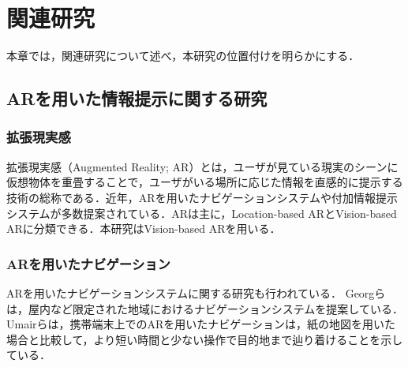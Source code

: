 \chapter{関連研究}
\label{chapter:relatedwork}
本章では，関連研究について述べ，本研究の位置付けを明らかにする．

\section{ARを用いた情報提示に関する研究}
  \subsection{拡張現実感}
    拡張現実感（Augmented Reality; AR）とは，ユーザが見ている現実のシーンに仮想物体を重畳することで，ユーザがいる場所に応じた情報を直感的に提示する技術の総称である\cite{Kambara:2010}．近年，ARを用いたナビゲーションシステムや付加情報提示システムが多数提案されている．ARは主に，Location-based ARとVision-based ARに分類できる\cite{Chatzopoulos:2017}．本研究はVision-based ARを用いる．

  \subsection{ARを用いたナビゲーション}
    ARを用いたナビゲーションシステムに関する研究も行われている．
    Georgらは，屋内など限定された地域におけるナビゲーションシステムを提案している\cite{Gerstweiler:2018}．
    Umairらは，携帯端末上でのARを用いたナビゲーションは，紙の地図を用いた場合と比較して，より短い時間と少ない操作で目的地まで辿り着けることを示している\cite{Rehman:2017}．

    
    


